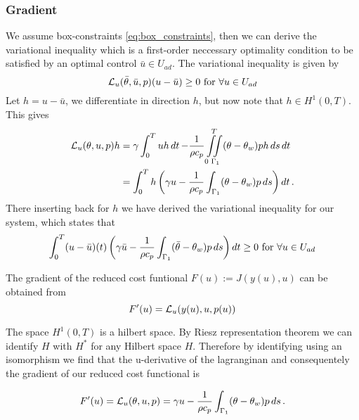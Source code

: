 \subsubsection{Gradient}
We assume box-constraints \eqref{eq:box_constraints}, then we can derive the variational inequality which is a first-order neccessary optimality condition to be satisfied by an optimal control $\bar{u} \in U_{ad}$. The variational inequality is given by 
\begin{equation*}
    \mathcal{L}_u(\bar{\theta},\bar{u},p)(u-\bar{u}) \geq 0 \text{ for } \forall u\in U_{ad}
\end{equation*}
Let $h = u - \bar{u}$, we differentiate in direction $h$, but now note that $h\in H^1(0, T)$. This gives
\begin{equation}
\begin{aligned} %
  \L_u(\theta, u, p) h &= \gamma\int_0^T uh \dt - \frac{1}{\rho c_p} \iint\limits_{0\,\,\Gamma_1}^{\,\,\,T}(\theta - \theta_w)ph \dsdt \\
  &= \int_0^T h \left( \gamma u - \frac{1}{\rho c_p} \int_{\Gamma_1}(\theta - \theta_w)p \mathop{ds} \right) \dt.
\end{aligned}
\end{equation}
There inserting back for $h$ we have derived the variational inequality for our system, which states that
\begin{equation}
    \label{eq:variational}
    \int_0^T (u - \bar{u})(t) \left( \gamma \bar{u} - \frac{1}{\rho c_p} \int_{\Gamma_1}(\bar{\theta} - \theta_w)p \mathop{ds} \right) \mathop{dt} \geq 0 \text{ for } \forall u \in U_{ad}
\end{equation}

The gradient of the reduced cost funtional $F(u) := J(y(u),u)$ can be obtained from 
\begin{equation*}
    F'(u) = \mathcal{L}_u(y(u),u,p(u))
\end{equation*}

The space $H^1(0,T)$ is a hilbert space. By Riesz representation theorem we can identify $H$ with $H^{*}$ for any Hilbert space $H$. Therefore by identifying using an isomorphism we find that the u-derivative of the lagranginan and consequentely the gradient of our reduced cost functional is

\begin{equation*}
    F'(u) = \mathcal{L}_u(\theta,u,p) = \gamma u - \frac{1}{\rho c_p}\int_{\Gamma_1}(\theta - \theta_w)p \mathop{ds}.
\end{equation*}



